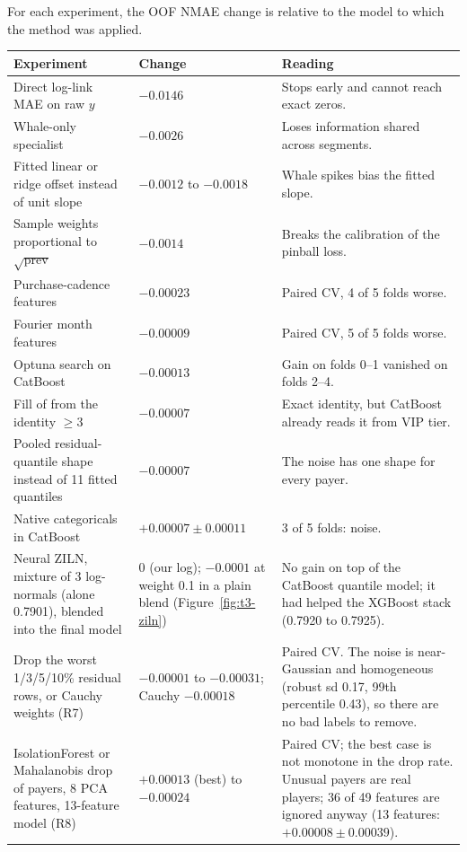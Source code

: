 \documentclass[../main.tex]{subfiles}
\begin{document}
For each experiment, the OOF NMAE change is relative to the model to which the method was applied.

\begin{table}[H]\centering\small
\begin{tabular}{@{}L{.38\linewidth}L{.16\linewidth}L{.38\linewidth}@{}}
\toprule
\textbf{Experiment} & \textbf{Change} & \textbf{Reading} \\
\midrule
Direct log-link MAE on raw $y$ & $-0.0146$ & Stops early and cannot reach exact zeros. \\
Whale-only specialist & $-0.0026$ & Loses information shared across segments. \\
Fitted linear or ridge offset instead of unit slope & $-0.0012$ to $-0.0018$ & Whale spikes bias the fitted slope. \\
Sample weights proportional to $\sqrt{\text{prev}}$ & $-0.0014$ & Breaks the calibration of the pinball loss. \\
Purchase-cadence features & $-0.00023$ & Paired CV, 4 of 5 folds worse. \\
Fourier month features & $-0.00009$ & Paired CV, 5 of 5 folds worse. \\
Optuna search on CatBoost & $-0.00013$ & Gain on folds 0--1 vanished on folds 2--4. \\
Fill of  from the identity $\ge3$ & $-0.00007$ & Exact identity, but CatBoost already reads it from VIP tier. \\
Pooled residual-quantile shape instead of 11 fitted quantiles & $-0.00007$ & The noise has one shape for every payer. \\
Native categoricals in CatBoost & $+0.00007\pm0.00011$ & 3 of 5 folds: noise. \\
Neural ZILN, mixture of 3 log-normals (alone 0.7901), blended into the final model & 0 (our log); $-0.0001$ at weight 0.1 in a plain blend (Figure~\ref{fig:t3-ziln}) & No gain on top of the CatBoost quantile model; it had helped the XGBoost stack (0.7920 to 0.7925). \\
Drop the worst 1/3/5/10\% residual rows, or Cauchy weights (R7) & $-0.00001$ to $-0.00031$; Cauchy $-0.00018$ & Paired CV. The noise is near-Gaussian and homogeneous (robust sd 0.17, 99th percentile 0.43), so there are no bad labels to remove. \\
IsolationForest or Mahalanobis drop of payers, 8 PCA features, 13-feature model (R8) & $+0.00013$ (best) to $-0.00024$ & Paired CV; the best case is not monotone in the drop rate. Unusual payers are real players; 36 of 49 features are ignored anyway (13 features: $+0.00008\pm0.00039$). \\

\end{tabular}
\end{table}
\end{document}

